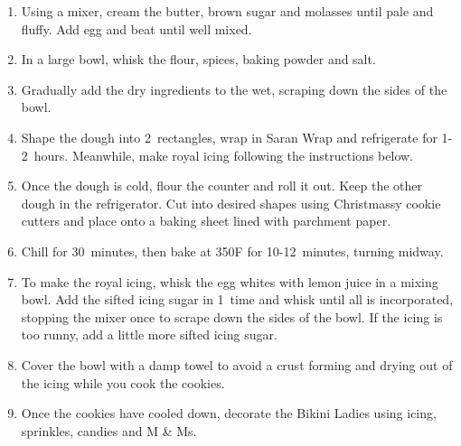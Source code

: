 \begin{enumerate}
    \item Using a mixer, cream the butter, brown sugar and molasses until pale and fluffy. Add egg and beat until well mixed.
    \item In a large bowl, whisk the flour, spices, baking powder and salt.
    \item Gradually add the dry ingredients to the wet, scraping down the sides of the bowl.
    \item Shape the dough into 2~rectangles, wrap in Saran Wrap and refrigerate for 1-2~hours. Meanwhile, make royal icing following the instructions below.
    \item Once the dough is cold, flour the counter and roll it out. Keep the other dough in the refrigerator. Cut into desired shapes using Christmassy cookie cutters and place onto a baking sheet lined with parchment paper.
    \item Chill for 30~minutes, then bake at 350\degree F for 10-12~minutes, turning midway.
    \item To make the royal icing, whisk the egg whites with lemon juice in a mixing bowl. Add the sifted icing sugar in 1~time and whisk until all is incorporated, stopping the mixer once to scrape down the sides of the bowl. If the icing is too runny, add a little more sifted icing sugar.
    \item Cover the bowl with a damp towel to avoid a crust forming and drying out of the icing while you cook the cookies.
    \item Once the cookies have cooled down, decorate the Bikini Ladies using icing, sprinkles, candies and M \& Ms.
\end{enumerate}
